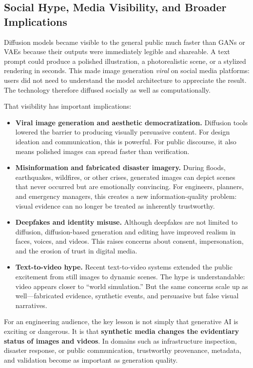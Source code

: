 \documentclass[12pt]{article}
\begin{document}
\subsection{Social Hype, Media Visibility, and Broader Implications}

Diffusion models became visible to the general public much faster than GANs or VAEs because their outputs were immediately legible and shareable. A text prompt could produce a polished illustration, a photorealistic scene, or a stylized rendering in seconds. This made image generation \emph{viral} on social media platforms: users did not need to understand the model architecture to appreciate the result. The technology therefore diffused socially as well as computationally.

That visibility has important implications:
\begin{itemize}
    \item \textbf{Viral image generation and aesthetic democratization.} Diffusion tools lowered the barrier to producing visually persuasive content. For design ideation and communication, this is powerful. For public discourse, it also means polished images can spread faster than verification.
    
    \item \textbf{Misinformation and fabricated disaster imagery.} During floods, earthquakes, wildfires, or other crises, generated images can depict scenes that never occurred but are emotionally convincing. For engineers, planners, and emergency managers, this creates a new information-quality problem: visual evidence can no longer be treated as inherently trustworthy.
    
    \item \textbf{Deepfakes and identity misuse.} Although deepfakes are not limited to diffusion, diffusion-based generation and editing have improved realism in faces, voices, and videos. This raises concerns about consent, impersonation, and the erosion of trust in digital media.
    
    \item \textbf{Text-to-video hype.} Recent text-to-video systems extended the public excitement from still images to dynamic scenes. The hype is understandable: video appears closer to ``world simulation.'' But the same concerns scale up as well---fabricated evidence, synthetic events, and persuasive but false visual narratives.
\end{itemize}

For an engineering audience, the key lesson is not simply that generative AI is exciting or dangerous. It is that \textbf{synthetic media changes the evidentiary status of images and videos}. In domains such as infrastructure inspection, disaster response, or public communication, trustworthy provenance, metadata, and validation become as important as generation quality.
\end{document}
